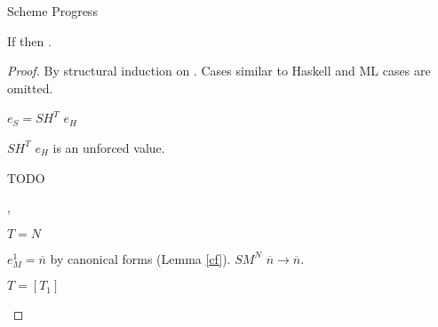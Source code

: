 \begin{theorem}{Scheme Progress}

\label{thmpss}

If \judes{}{\first{\varexps}}{\tytst} then \pshyp{\first{\varexps}}{\second{\varexps}}.

\begin{proof}

By structural induction on \first{\varexps}.  Cases similar to Haskell and ML cases are omitted.


\begin{case}

$e_{S}=SH^{T}$ $e_{H}$

$SH^{T}$ $e_{H}$ is an unforced value.

TODO

\end{case}


\newcommand{\pssm}{\expsm{\first{\varcsm}}{\first{\varexpm}}}

\begin{case}{\pssm}

\pshypby
{\first{\varexpm}}
{\second{\varexpm}}
\pssub
{\first{\varexpm}}
{\second{\varexpm}}
{\pssm}
{\expsm{\first{\varcsm}}{\second{\varexpm}}}
\pserr
{\first{\varexpm}}
{\pssm}
\pscasesone
{\first{\varexpm}}
{\first{\varcsm}}
{\pssm}


\renewcommand{\x}{\expmh{\cslump}{\first{\varcsh}}{\first{\varexph}}}
\renewcommand{\y}{\expms{\cslump}{\first{\varvalfs}}}

\begin{subcase}{\cslump}

\psvalcanin
{\first{\varexpm}}
{\x, \y}
\psred
{\expsm{\cslump}{(\x)}}
{\expwrongd{\errvalue}}
\psred
{\expsm{\cslump}{(\y)}}
{\first{\varvalfs}}

\end{subcase}

\begin{subcase}

$T=N$

$e_{M}^{1}=\overline{n}$ by canonical forms (Lemma \ref{cf}).  $SM^{N}$ $\overline{n}\rightarrow\overline{n}$.

\end{subcase}

\begin{subcase}

$T=[T_{1}]$


\end{subcase}
\end{case}
\end{proof}
\end{theorem}
